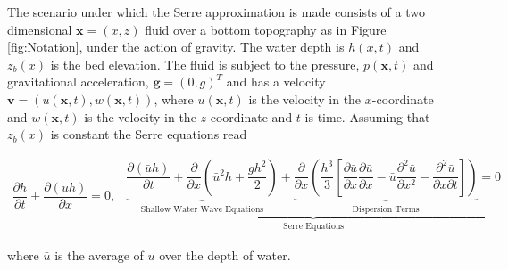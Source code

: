 \documentclass[SingleSpace,12pt,Proceedings]{Serre_ASCE}
\begin{document}
The scenario under which the Serre approximation is made consists of a two dimensional $\textbf{x} = (x,z)$ fluid over a bottom topography as in Figure \ref{fig:Notation}, under the action of gravity. The water depth is $h(x,t)$ and $z_b(x)$ is the bed elevation. The fluid is subject to the pressure, $p(\textbf{x},t)$ and gravitational acceleration, $\textbf{g} = (0,g)^T$ and has a velocity $\textbf{v} = (u(\textbf{x},t),w(\textbf{x},t))$, where $u(\textbf{x},t)$ is the velocity in the $x$-coordinate and $w(\textbf{x},t)$ is the velocity in the $z$-coordinate and $t$ is time. Assuming that $z_b(x)$ is constant the Serre equations read \cite{Guyenne-etal-2014-169,Zoppou-2014}
\begin{linenomath*}
\begin{subequations}\label{eq:Serre_conservative_form}
\begin{gather}
\dfrac{\partial h}{\partial t} + \dfrac{\partial (\bar{u}h)}{\partial x} = 0,
\label{eq:Serre_continuity}
\end{gather}
\begin{gather}
\underbrace{\underbrace{\dfrac{\partial (\bar{u}h)}{\partial t} + \dfrac{\partial}{\partial x} \left ( \bar{u}^2h + \dfrac{gh^2}{2}\right )}_{\text{Shallow Water Wave Equations}} + \underbrace{\dfrac{\partial}{\partial x} \left (  \dfrac{h^3}{3} \left [ \dfrac{\partial \bar{u} }{\partial x} \dfrac{\partial \bar{u}}{\partial x} - \bar{u} \dfrac{\partial^2 \bar{u}}{\partial x^2}  - \dfrac{\partial^2 \bar{u}}{\partial x \partial t}\right ] \right )}_{\text{Dispersion Terms}} = 0}_{\text{Serre Equations}}
\label{eq:Serre_momentum}
\end{gather}
\end{subequations}
\end{linenomath*}
where $\bar{u}$ is the average of $u$ over the depth of water.
\end{document}
